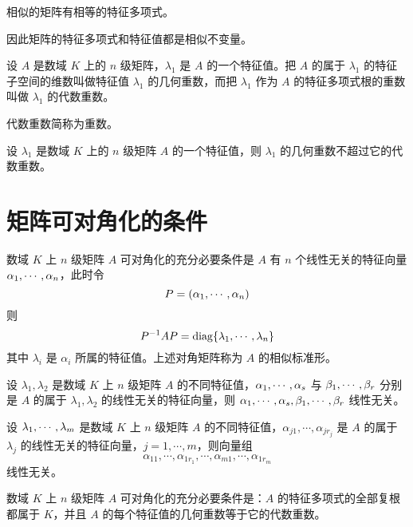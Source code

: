 \begin{theorem}
	相似的矩阵有相等的特征多项式。
\end{theorem}

因此矩阵的特征多项式和特征值都是相似不变量。

\begin{definition}
	设 $A$ 是数域 $K$ 上的 $n$ 级矩阵，$\lambda_1$ 是 $A$ 的一个特征值。把 $A$ 的属于 $\lambda_1$ 的特征子空间的维数叫做特征值 $\lambda_1$ 的几何重数，而把 $\lambda_1$ 作为 $A$ 的特征多项式根的重数叫做 $\lambda_1$ 的代数重数。 
\end{definition}

代数重数简称为重数。

\begin{theorem}
	设 $\lambda_1$ 是数域 $K$ 上的 $n$ 级矩阵 $A$ 的一个特征值，则 $\lambda_1$ 的几何重数不超过它的代数重数。
\end{theorem}

\section{矩阵可对角化的条件}

\begin{theorem}
	数域 $K$ 上 $n$ 级矩阵 $A$ 可对角化的充分必要条件是 $A$ 有 $n$ 个线性无关的特征向量 $\alpha_1,\cdots,\alpha_n$，此时令
	\[P=(\alpha_1,\cdots,\alpha_n)\]
	则
	\[P^{-1}AP = \operatorname{diag}\{\lambda_1,\cdots,\lambda_n\}\]
	其中 $\lambda_i$ 是 $\alpha_i$ 所属的特征值。上述对角矩阵称为 $A$ 的相似标准形。
\end{theorem}

\begin{theorem}
	设 $\lambda_1,\lambda_2$ 是数域 $K$ 上 $n$ 级矩阵 $A$ 的不同特征值，$\alpha_1,\cdots,\alpha_s$ 与 $\beta_1,\cdots,\beta_r$ 分别是 $A$ 的属于 $\lambda_1,\lambda_2$ 的线性无关的特征向量，则 $\alpha_1,\cdots,\alpha_s,\beta_1,\cdots,\beta_r$ 线性无关。
\end{theorem}

\begin{theorem}
	设 $\lambda_1,\cdots,\lambda_m$ 是数域 $K$ 上 $n$ 级矩阵 $A$ 的不同特征值，$\alpha_{j1},\cdots,\alpha_{jr_j}$ 是 $A$ 的属于 $\lambda_j$ 的线性无关的特征向量，$j=1,\cdots,m$，则向量组
	\[\alpha_{11},\cdots,\alpha_{1r_1},\cdots,\alpha_{m1},\cdots,\alpha_{1r_m}\]
	线性无关。
\end{theorem}

\begin{theorem}
	数域 $K$ 上 $n$ 级矩阵 $A$ 可对角化的充分必要条件是：$A$ 的特征多项式的全部复根都属于 $K$，并且 $A$ 的每个特征值的几何重数等于它的代数重数。
\end{theorem}

